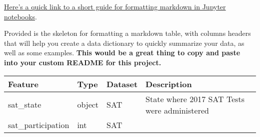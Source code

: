 \documentclass[11pt]{article}
\begin{document}
\href{https://jupyter-notebook.readthedocs.io/en/stable/examples/Notebook/Working\%20With\%20Markdown\%20Cells.html}{Here's
a quick link to a short guide for formatting markdown in Jupyter
notebooks}.

Provided is the skeleton for formatting a markdown table, with columns
headers that will help you create a data dictionary to quickly summarize
your data, as well as some examples. \textbf{This would be a great thing
to copy and paste into your custom README for this project.}

    \begin{longtable}[]{@{}llll@{}}
\toprule
\begin{minipage}[b]{0.05\columnwidth}\raggedright\strut
Feature\strut
\end{minipage} & \begin{minipage}[b]{0.05\columnwidth}\raggedright\strut
Type\strut
\end{minipage} & \begin{minipage}[b]{0.05\columnwidth}\raggedright\strut
Dataset\strut
\end{minipage} & \begin{minipage}[b]{0.05\columnwidth}\raggedright\strut
Description\strut
\end{minipage}\tabularnewline
\midrule
\endhead
\begin{minipage}[t]{0.05\columnwidth}\raggedright\strut
sat\_state\strut
\end{minipage} & \begin{minipage}[t]{0.05\columnwidth}\raggedright\strut
object\strut
\end{minipage} & \begin{minipage}[t]{0.05\columnwidth}\raggedright\strut
SAT\strut
\end{minipage} & \begin{minipage}[t]{0.05\columnwidth}\raggedright\strut
State where 2017 SAT Tests were administered\strut
\end{minipage}\tabularnewline
\begin{minipage}[t]{0.05\columnwidth}\raggedright\strut
sat\_participation\strut
\end{minipage} & \begin{minipage}[t]{0.05\columnwidth}\raggedright\strut
int\strut
\end{minipage} & \begin{minipage}[t]{0.05\columnwidth}\raggedright\strut
SAT\strut
\end{minipage} & \begin{minipage}[t]{0.05\columnwidth}\raggedright\strut

\end{minipage}
\end{longtable}
\end{document}
